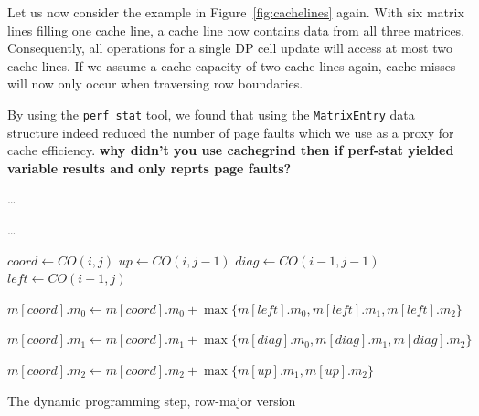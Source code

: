\documentclass[runningheads,a4paper]{llncs}
\begin{document}
Let us now consider the example in Figure~\ref{fig:cachelines} again. 
With six matrix lines filling one cache line, a cache line now contains data from all three matrices. 
Consequently, all operations for a single DP cell update 
will access at most two cache lines. 
If we assume a cache capacity of two cache lines again, cache misses will now only occur when traversing row boundaries.

By using the \texttt{perf stat} tool, we found that using the \texttt{MatrixEntry} data structure indeed reduced 
the number of page faults which we use as a proxy for cache efficiency. 
{\bf why didn't you use cachegrind then if perf-stat yielded variable results and only reprts page faults?}


\begin{algorithm}

\ldots{}
 {
	 {
		\ldots{}
		
		$coord \gets CO(i, j)$\;	
		$up \gets CO(i, j-1)$\;
		$diag \gets CO(i-1, j-1)$\;		
		$left \gets CO(i-1, j)$\;
		
		$m[coord].m_0 \gets m[coord].m_0 + \max\{m[left].m_0, m[left].m_1, m[left].m_2\}$\;
		
		$m[coord].m_1 \gets m[coord].m_1 + \max\{m[diag].m_0, m[diag].m_1, m[diag].m_2\}$\;
		
		$m[coord].m_2 \gets m[coord].m_2 + \max\{m[up].m_1, m[up].m_2\}$\;
	}
}

\caption{The dynamic programming step, row-major version}
\label{alg:dp}
\end{algorithm}
\end{document}

